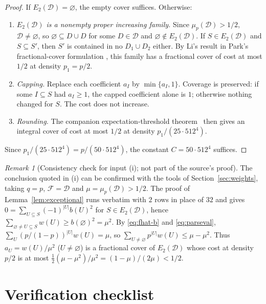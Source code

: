 \documentclass[11pt,letterpaper]{article}
\theoremstyle{definition}
\theoremstyle{remark}
\newtheorem{remark}[theorem]{Remark}
\numberwithin{equation}{section}
\begin{document}
\begin{proof}
If $E_2(\mathcal D)=\varnothing$, the empty cover suffices. Otherwise:
\begin{enumerate}[label=(\roman*)]
\item \emph{$E_2(\mathcal D)$ is a nonempty proper increasing family.}
Since $\mu_p(\mathcal D)>1/2$, $\mathcal D\ne\varnothing$, so
$\varnothing\subseteq D\cup D$ for some $D\in\mathcal D$ and
$\varnothing\notin E_2(\mathcal D)$. If $S\in E_2(\mathcal D)$ and
$S\subseteq S'$, then $S'$ is contained in no $D_1\cup D_2$ either. By
Li's result \cite[Corollary~3.1]{Li26} in Park's fractional-cover
formulation \cite[Theorem~3.4]{Park26}, this family has a fractional cover
of cost at most $1/2$ at density $p_1=p/2$.
\item \emph{Capping.} Replace each coefficient $a_I$ by $\min\{a_I,1\}$.
Coverage is preserved: if some $I\subseteq S$ had $a_I\ge1$, the capped
coefficient alone is $1$; otherwise nothing changed for $S$. The cost does
not increase.
\item \emph{Rounding.} The companion expectation-threshold
theorem~\cite[Theorem~1.1]{OpenAIThreshold26} then gives an integral cover
of cost at most $1/2$ at density $p_1/(25\cdot512^4)$.
\end{enumerate}
Since $p_1/(25\cdot512^4)=p/(50\cdot512^4)$, the constant
$C=50\cdot512^4$ suffices.
\end{proof}

\begin{remark}[Consistency check for input (i); not part of the source's
proof]
The conclusion quoted in (i) can be confirmed with the tools of
Section~\ref{sec:weights}, taking $q=p$, $\mathcal F=\mathcal D$ and
$\mu=\mu_p(\mathcal D)>1/2$. The proof of Lemma~\ref{lem:exceptional}
runs verbatim with $2$ rows in place of $32$ and gives
$0=\sum_{U\subseteq S}(-1)^{|U|}b(U)^2$ for $S\in E_2(\mathcal D)$, hence
$\sum_{\varnothing\ne U\subseteq S}w(U)\ge b(\varnothing)^2=\mu^2$. By
\eqref{eq:fhat-b} and \eqref{eq:parseval},
$\sum_{U}(p/(1-p))^{|U|}w(U)=\mu$, so
$\sum_{U\ne\varnothing}p^{|U|}w(U)\le\mu-\mu^2$. Thus
$a_U=w(U)/\mu^2$ ($U\ne\varnothing$) is a fractional cover of
$E_2(\mathcal D)$ whose cost at density $p/2$ is at most
$\tfrac12(\mu-\mu^2)/\mu^2=(1-\mu)/(2\mu)<1/2$.
\end{remark}

\section{Verification checklist}
\label{sec:checklist}
\end{document}
